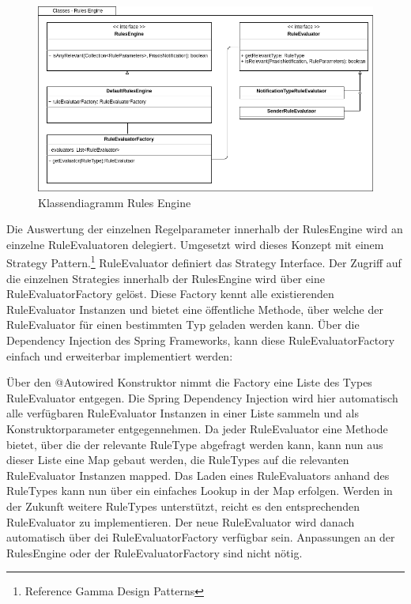 \begin{figure}[h]
    \centering
    \begin{minipage}[b]{0.9\textwidth}
        \includegraphics[width=\textwidth]{graphics/Class_Configuration_RulesEngine}
        \caption{Klassendiagramm Rules Engine}
    \end{minipage}
\end{figure}

Die Auswertung der einzelnen Regelparameter innerhalb der RulesEngine wird an einzelne RuleEvaluatoren delegiert.
Umgesetzt wird dieses Konzept mit einem Strategy Pattern.\footnote{Reference Gamma Design Patterns}
RuleEvaluator definiert das Strategy Interface.
Der Zugriff auf die einzelnen Strategies innerhalb der RulesEngine wird über eine RuleEvaluatorFactory gelöst.
Diese Factory kennt alle existierenden RuleEvaluator Instanzen und bietet eine öffentliche Methode, über welche der RuleEvaluator für einen bestimmten Typ geladen werden kann.
Über die Dependency Injection des Spring Frameworks, kann diese RuleEvaluatorFactory einfach und erweiterbar implementiert werden:



Über den @Autowired Konstruktor nimmt die Factory eine Liste des Types RuleEvaluator entgegen.
Die Spring Dependency Injection wird hier automatisch alle verfügbaren RuleEvaluator Instanzen in einer Liste sammeln und als Konstruktorparameter entgegennehmen.
Da jeder RuleEvaluator eine Methode bietet, über die der relevante RuleType abgefragt werden kann, kann nun aus dieser Liste eine Map gebaut werden, die RuleTypes auf die relevanten RuleEvaluator Instanzen mapped.
Das Laden eines RuleEvaluators anhand des RuleTypes kann nun über ein einfaches Lookup in der Map erfolgen.
Werden in der Zukunft weitere RuleTypes unterstützt, reicht es den entsprechenden RuleEvaluator zu implementieren.
Der neue RuleEvaluator wird danach automatisch über dei RuleEvaluatorFactory verfügbar sein.
Anpassungen an der RulesEngine oder der RuleEvaluatorFactory sind nicht nötig.

